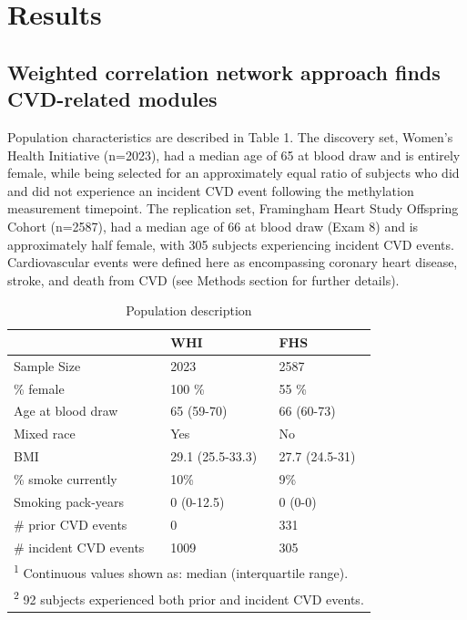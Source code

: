 \documentclass[]{article}
\theoremstyle{definition}
\theoremstyle{definition}
\theoremstyle{definition}
\theoremstyle{remark}
\begin{document}
\section{Results}\label{results}

\subsection{Weighted correlation network approach finds CVD-related
modules}\label{weighted-correlation-network-approach-finds-cvd-related-modules}

Population characteristics are described in Table 1. The discovery set,
Women's Health Initiative (n=2023), had a median age of 65 at blood draw
and is entirely female, while being selected for an approximately equal
ratio of subjects who did and did not experience an incident CVD event
following the methylation measurement timepoint. The replication set,
Framingham Heart Study Offspring Cohort (n=2587), had a median age of 66
at blood draw (Exam 8) and is approximately half female, with 305
subjects experiencing incident CVD events. Cardiovascular events were
defined here as encompassing coronary heart disease, stroke, and death
from CVD (see Methods section for further details).

\begin{table}

\caption{\label{tab:population-description}Population description}
\centering
\begin{tabular}[t]{lll}
\toprule
  & WHI & FHS\\
\midrule
Sample Size & 2023 & 2587\\
\% female & 100 \% & 55 \%\\
Age at blood draw & 65 (59-70) & 66 (60-73)\\
Mixed race & Yes & No\\
BMI & 29.1 (25.5-33.3) & 27.7 (24.5-31)\\
\addlinespace
\% smoke currently & 10\% & 9\%\\
Smoking pack-years & 0 (0-12.5) & 0 (0-0)\\
\# prior CVD events & 0 & 331\\
\# incident CVD events & 1009 & 305\\
\bottomrule
\multicolumn{3}{l}{\textsuperscript{1} Continuous values shown as: median (interquartile range).}\\
\multicolumn{3}{l}{\textsuperscript{2} 92 subjects experienced both prior and incident CVD events.}\\
\end{tabular}
\end{table}
\end{document}
